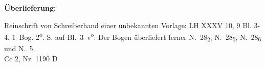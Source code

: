 \begin{ledgroupsized}[r]{120mm}
\footnotesize 
\pstart 
\noindent\textbf{\"{U}berlieferung:}
\pend
\end{ledgroupsized}
\begin{ledgroupsized}[r]{114mm}
\footnotesize 
\pstart \parindent -6mm
%
Reinschrift von Schreiberhand einer unbekannten Vorlage: LH XXXV 10, 9 Bl. 3-4. 1~Bog. 2\textsuperscript{o}.  S. auf Bl.~3~v\textsuperscript{o}. Der Bogen überliefert ferner N.~28\textsubscript{2}, N.~28\textsubscript{5}, N.~28\textsubscript{6} und N.~5.
\\
Cc 2, Nr. 1190 D
\pend
\end{ledgroupsized}

\vspace*{8mm}

